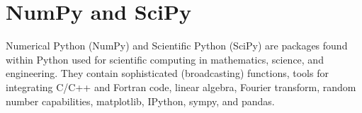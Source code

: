 \section*{NumPy and SciPy}
Numerical Python (NumPy) and Scientific Python (SciPy) are packages found
within Python used for scientific computing in mathematics, science, and
engineering. They contain sophisticated (broadcasting) functions,
tools for integrating C/C++ and Fortran code, linear algebra, 
Fourier transform, random number capabilities, matplotlib, IPython,
sympy, and pandas.

